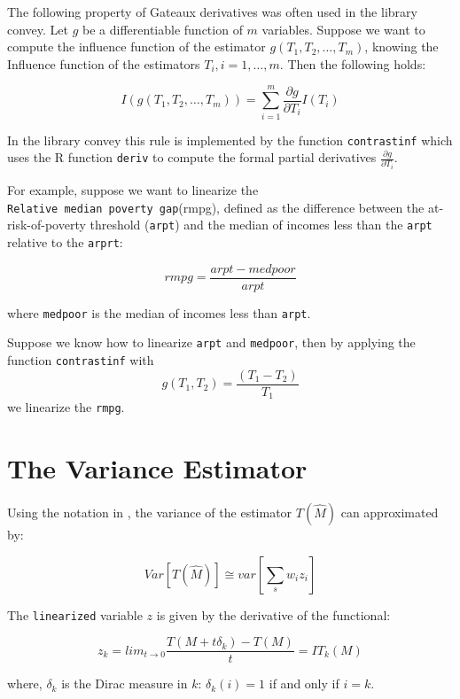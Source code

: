 \documentclass[]{book}
\begin{document}
The following property of Gateaux derivatives was often used in the
library convey. Let \(g\) be a differentiable function of \(m\)
variables. Suppose we want to compute the influence function of the
estimator \(g(T_1, T_2,\ldots, T_m)\), knowing the Influence function of
the estimators \(T_i, i=1,\ldots, m\). Then the following holds:

\[
I(g(T_1, T_2,\ldots, T_m)) = \sum_{i=1}^m \frac{\partial g}{\partial T_i}I(T_i)
\]

In the library convey this rule is implemented by the function
\texttt{contrastinf} which uses the R function \texttt{deriv} to compute
the formal partial derivatives \(\frac{\partial g}{\partial T_i}\).

For example, suppose we want to linearize the
\texttt{Relative\ median\ poverty\ gap}(rmpg), defined as the difference
between the at-risk-of-poverty threshold (\texttt{arpt}) and the median
of incomes less than the \texttt{arpt} relative to the \texttt{arprt}:

\[
rmpg= \frac{arpt-medpoor} {arpt}
\]

where \texttt{medpoor} is the median of incomes less than \texttt{arpt}.

Suppose we know how to linearize \texttt{arpt} and \texttt{medpoor},
then by applying the function \texttt{contrastinf} with \[
g(T_1,T_2)= \frac{(T_1 - T_2)}{T_1}
\] we linearize the \texttt{rmpg}.

\section{The Variance Estimator}\label{the-variance-estimator}

Using the notation in \citep{osier2009}, the variance of the estimator
\(T(\hat{M})\) can approximated by:

\begin{equation}
Var\left[T(\hat{M})\right]\cong var\left[\sum_s w_i z_i\right]
\label{eq:var}
\end{equation}

The \texttt{linearized} variable \(z\) is given by the derivative of the
functional:

\begin{equation}
z_k=lim_{t\rightarrow0}\frac{T(M+t\delta_k)-T(M)}{t}=IT_k(M)
\label{eq:lin}
\end{equation}

where, \(\delta_k\) is the Dirac measure in \(k\): \(\delta_k(i)=1\) if
and only if \(i=k\).
\end{document}
